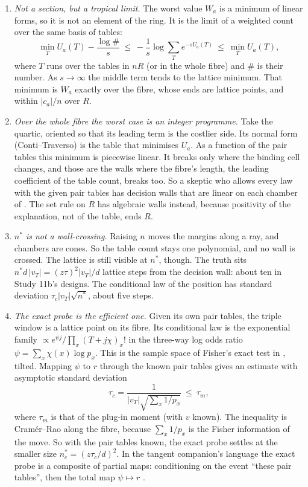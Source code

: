 \begin{proposition}\label{prop:tropical}
\begin{enumerate}
\item[(i)] \emph{Not a section, but a tropical limit.} The worst value $W_a$ is a minimum of linear forms, so it is not an element of the
ring. It is the limit of a weighted count over the same basis of tables:
\[
\min_{T}U_a(T)-\frac{\log\#}{s}\ \le\ -\frac1s\log\sum_{T}e^{-sU_a(T)}\ \le\ \min_{T}U_a(T),
\]
where $T$ runs over the tables in $nR$ (or in the whole fibre) and $\#$ is their number. As $s\to\infty$ the middle term tends to the
lattice minimum. That minimum is $W_a$ exactly over the fibre, whose ends are lattice points, and within $|c_a|/n$ over $R$.
\item[(ii)] \emph{Over the whole fibre the worst case is an integer programme.} Take the quartic, oriented so that its leading term is
the costlier side. Its normal form (Conti--Traverso) is the table that minimises $U_a$. As a function of the pair tables this minimum is
piecewise linear. It breaks only where the binding cell changes, and those are the walls where the fibre's length, the leading
coefficient of the table count, breaks too. So a skeptic who allows every law with the given pair tables has decision walls that are
linear on each chamber of \cite{CouplingAlgebras}. The set rule on $R$ has algebraic walls instead, because positivity of the
explanation, not of the table, ends $R$.
\item[(iii)] \emph{$n^*$ is not a wall-crossing.} Raising $n$ moves the margins along a ray, and chambers are cones. So the table count
stays one polynomial, and no wall is crossed. The lattice is still visible at $n^*$, though. The truth sits
$n^*d\,|v_T|=(z\tau)^2|v_T|/d$ lattice steps from the decision wall: about ten in Study 11b's designs. The conditional law of the
position has standard deviation $\tau_c|v_T|\sqrt{n^*}$, about five steps.
\item[(iv)] \emph{The exact probe is the efficient one.} Given its own pair tables, the triple window is a lattice point on its fibre.
Its conditional law is the exponential family $\propto e^{\psi j}/\prod_x(T+j\chi)_x!$ in the three-way log odds ratio
$\psi=\sum_x\chi(x)\log p_x$. This is the sample space of Fisher's exact test in \cite[Thm.~7.1(iv)]{CouplingAlgebras}, tilted. Mapping
$\psi$ to $r$ through the known pair tables gives an estimate with asymptotic standard deviation
\[
\tau_c=\frac{1}{|v_T|\sqrt{\sum_x1/p_x}}\ \le\ \tau_m ,
\]
where $\tau_m$ is that of the plug-in moment (with $v$ known). The inequality is Cram\'er--Rao along the fibre, because $\sum_x1/p_x$ is
the Fisher information of the move. So with the pair tables known, the exact probe settles at the smaller size $n^*_c=(z\tau_c/d)^2$. In the tangent companion's
language the exact probe is a composite of partial maps: conditioning on the event ``these pair tables'', then the total map
$\psi\mapsto r$ \cite[Section ``The restriction structure, checked'']{TangentCompanion}.
\end{enumerate}
\end{proposition}

